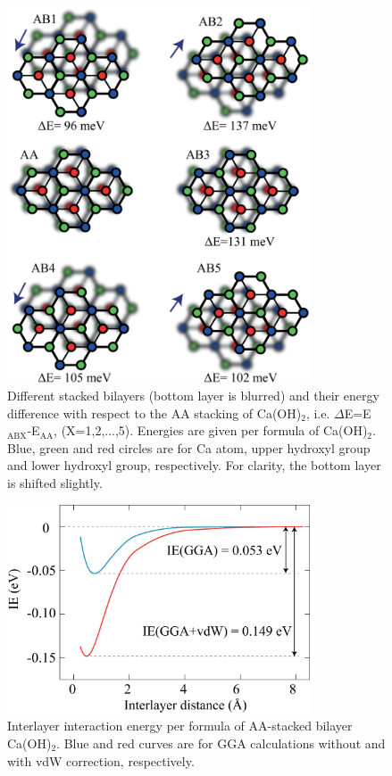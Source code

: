 \begin{figure}[htb]
\centering
\includegraphics[width=0.8\textwidth]{stack_caoh2.eps}
\caption{\label{fig:stack_caoh2} Different stacked bilayers (bottom layer is blurred)
and their energy difference with respect to the AA stacking of Ca(OH)$_2$, i.e.
$\Delta$E=E$_{\text{ABX}}$-E$_{\text{AA}}$, (X=1,2,...,5). Energies are given
per formula of Ca(OH)$_2$. Blue, green and red circles are for Ca atom, 
upper hydroxyl group and lower hydroxyl group, respectively. For clarity, the 
bottom layer is shifted slightly.}
\end{figure}

\begin{figure}[htb]
\centering
\includegraphics[width=0.8\textwidth]{int_caoh2.eps}
\caption{\label{fig:int_caoh2} Interlayer interaction energy per formula of
AA-stacked bilayer Ca(OH)$_2$. Blue and red curves are for GGA calculations
without and with vdW correction, respectively.}
\end{figure}

